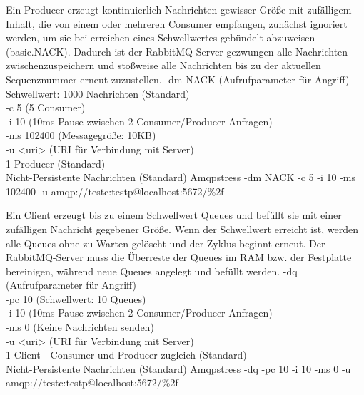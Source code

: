 \documentclass[	a4paper,
			11pt,
			titlepage,
			oneside,
			fleqn,
			listof=totoc,
			parskip,
			numbers=noenddot]{scrartcl}
\begin{document}
\clearpage	
		{Ein Producer erzeugt kontinuierlich Nachrichten gewisser Größe mit zufälligem Inhalt, die von einem oder mehreren Consumer empfangen, zunächst ignoriert werden, um sie bei erreichen eines Schwellwertes gebündelt abzuweisen (basic.NACK). Dadurch ist der RabbitMQ-Server gezwungen alle Nachrichten zwischenzuspeichern und stoßweise alle Nachrichten bis zu der aktuellen Sequenznummer erneut zuzustellen.}%
		{%
		 -dm NACK (Aufrufparameter für Angriff) \\
		 Schwellwert: 1000 Nachrichten (Standard) \\
		 -c 5 (5 Consumer) \\
		 -i 10 (10ms Pause zwischen 2 Consumer/Producer-Anfragen) \\
		 -ms 102400 (Messagegröße: 10KB) \\
		 -u <uri> (URI für Verbindung mit Server) \\
		 1 Producer (Standard) \\
		 Nicht-Persistente Nachrichten (Standard)
		}%
		{Amqpstress -dm NACK -c 5 -i 10 -ms 102400 -u amqp://testc:testp@localhost:5672/\%2f}%
		{}
		
\clearpage
		{Ein Client erzeugt bis zu einem Schwellwert Queues und befüllt sie mit einer zufälligen Nachricht gegebener Größe. Wenn der Schwellwert erreicht ist, werden alle Queues ohne zu Warten gelöscht und der Zyklus beginnt erneut. Der RabbitMQ-Server muss die Überreste der Queues im RAM bzw. der Festplatte bereinigen, während neue Queues angelegt und befüllt werden.}%
		{%
		 -dq (Aufrufparameter für Angriff) \\
		 -pc 10 (Schwellwert: 10 Queues) \\
		 -i 10 (10ms Pause zwischen 2 Consumer/Producer-Anfragen) \\
		 -ms 0 (Keine Nachrichten senden) \\
		 -u <uri> (URI für Verbindung mit Server) \\
		 1 Client - Consumer und Producer zugleich (Standard) \\
		 Nicht-Persistente Nachrichten (Standard)
		}%
		{Amqpstress -dq -pc 10 -i 10 -ms 0  -u amqp://testc:testp@localhost:5672/\%2f}%
		{}
\end{document}

